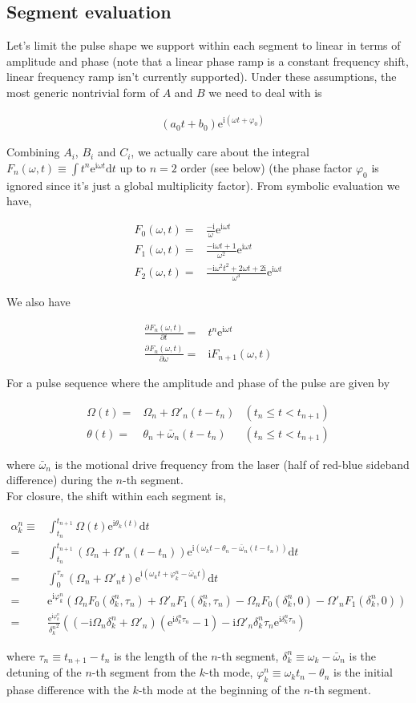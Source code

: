 \documentclass[10pt,fleqn]{article}
\newcommand{\ud}{\mathrm{d}}
\newcommand{\ue}{\mathrm{e}}
\newcommand{\ui}{\mathrm{i}}
\newcommand{\eqar}[1]
{
  \begin{align*}
    #1
  \end{align*}
}
\newcommand{\paren}[1]{{\left({#1}\right)}}
\newcommand{\pdiff}[3][{}]{{\frac{\partial^{#1} {#2}}{\partial {#3}{}^{#1}}}}
\begin{document}
\subsection{Segment evaluation}
Let's limit the pulse shape we support within each segment to linear in terms of
amplitude and phase (note that a linear phase ramp is a constant frequency shift,
linear frequency ramp isn't currently supported).
Under these assumptions, the most generic nontrivial form of $A$ and $B$
we need to deal with is
\eqar{
  &(a_0t + b_0)\ue^{\ui \paren{\omega t + \varphi_0}}
}
Combining $A_i$, $B_i$ and $C_i$, we actually care about the integral
$\displaystyle F_n(\omega, t)\equiv\int t^n\ue^{\ui\omega t}\ud t$
up to $n=2$ order (see below) (the phase factor $\varphi_0$ is ignored
since it's just a global multiplicity factor). From symbolic evaluation we have,
\eqar{
  F_0(\omega, t)=&\frac{-\ui}{\omega}\ue^{\ui\omega t}\\
  F_1(\omega, t)=&\frac{-\ui\omega t + 1}{\omega^2}\ue^{\ui\omega t}\\
  F_2(\omega, t)=&\frac{-\ui\omega^2t^2+2\omega t+2\ui}{\omega^3}\ue^{\ui\omega t}
}
We also have
\eqar{
  \pdiff{F_n(\omega, t)}{t}=&t^n\ue^{\ui\omega t}\\
  \pdiff{F_n(\omega, t)}{\omega}=&\ui F_{n+1}(\omega, t)
}

For a pulse sequence where the amplitude and phase of the pulse are given by
\eqar{
  \Omega(t)=&\Omega_n+\Omega'_n\paren{t-t_n}&(t_n\leqslant t<t_{n+1})\\
  \theta(t)=&\theta_n+\bar\omega_n\paren{t-t_n}&(t_n\leqslant t<t_{n+1})
}
where $\bar\omega_n$ is the motional drive frequency from the laser
(half of red-blue sideband difference) during the $n$-th segment.\\

For closure, the shift within each segment is,
\eqar{
  \alpha_k^n\equiv&\int_{t_n}^{t_{n+1}}\Omega(t)\ue^{\ui\theta_k(t)}\ud t\\
  =&\int_{t_n}^{t_{n+1}}\paren{\Omega_n+\Omega'_n\paren{t-t_n}}\ue^{\ui\paren{\omega_kt-\theta_n-\bar\omega_n\paren{t-t_n}}}\ud t\\
  =&\int_{0}^{\tau_n}\paren{\Omega_n+\Omega'_n t}\ue^{\ui\paren{\omega_kt+\varphi_k^n-\bar\omega_n t}}\ud t\\
  =&\ue^{\ui\varphi_k^n}\paren{\Omega_nF_0(\delta_k^n, \tau_n)+\Omega'_nF_1(\delta_k^n, \tau_n)-\Omega_nF_0(\delta_k^n, 0)-\Omega'_nF_1(\delta_k^n, 0)}\\
  =&\frac{\ue^{\ui\varphi_k^n}}{{\delta_k^n}^2}\paren{
    \paren{-\ui\Omega_n\delta_k^n+\Omega'_n}\paren{\ue^{\ui\delta_k^n\tau_n}-1}
    -\ui\Omega'_n\delta_k^n\tau_n\ue^{\ui\delta_k^n\tau_n}}
}
where $\tau_n\equiv t_{n+1}-t_n$ is the length of the $n$-th segment, $\delta_k^n\equiv\omega_k-\bar\omega_n$ is the detuning of the $n$-th segment from the $k$-th mode, $\varphi_k^n\equiv\omega_kt_n-\theta_n$ is the initial phase difference with the $k$-th mode at the beginning of the $n$-th segment.\\
\end{document}
